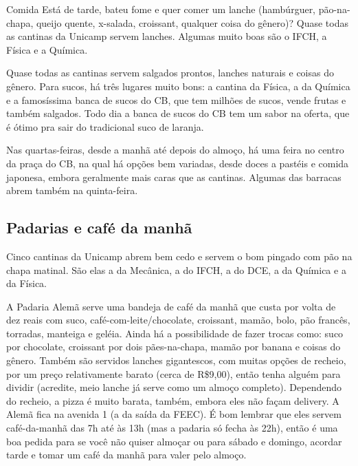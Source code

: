 \begin{story}{Comida}
Está de tarde, bateu fome e quer comer um lanche (hambúrguer, pão-na-chapa, queijo quente, x-salada, croissant, qualquer coisa do gênero)? Quase todas as cantinas da Unicamp servem lanches. Algumas muito boas são o IFCH, a Física e a Química.

Quase todas as cantinas servem salgados prontos, lanches naturais e coisas do gênero. Para sucos, há três lugares muito bons: a cantina da Física, a da Química e a famosíssima banca de sucos do CB, que tem milhões de sucos, vende frutas e também salgados. Todo dia a banca de sucos do CB tem um sabor na oferta, que é ótimo pra sair do tradicional suco de laranja.

Nas quartas-feiras, desde a manhã até depois do almoço, há uma feira no centro da praça do CB, na qual há opções bem variadas, desde doces a pastéis e comida japonesa, embora geralmente mais caras que as cantinas. Algumas das barracas abrem também na quinta-feira.

\subsection*{Padarias e café da manhã}

Cinco cantinas da Unicamp abrem bem cedo e servem o bom pingado com pão na chapa matinal. São elas a da Mecânica, a do IFCH, a do DCE, a da Química e a da Física.

A Padaria Alemã serve uma bandeja de café da manhã que custa por volta de dez reais com suco, café-com-leite/chocolate, croissant, mamão, bolo, pão francês, torradas, manteiga e geléia. Ainda há a possibilidade de fazer trocas como: suco por chocolate, croissant por dois pães-na-chapa, mamão por banana e coisas do gênero. Também são servidos lanches gigantescos, com muitas opções de recheio, por um preço relativamente barato (cerca de R\$9,00), então tenha alguém para dividir (acredite, meio lanche já serve como um almoço completo). Dependendo do recheio, a pizza é muito barata, também, embora eles não façam delivery. A Alemã fica na avenida 1 (a da saída da FEEC). É bom lembrar que eles servem café-da-manhã das 7h até às 13h (mas a padaria só fecha às 22h), então é uma boa pedida para se você não quiser almoçar ou para sábado e domingo, acordar tarde e tomar um café da manhã para valer pelo almoço.


\end{story}
